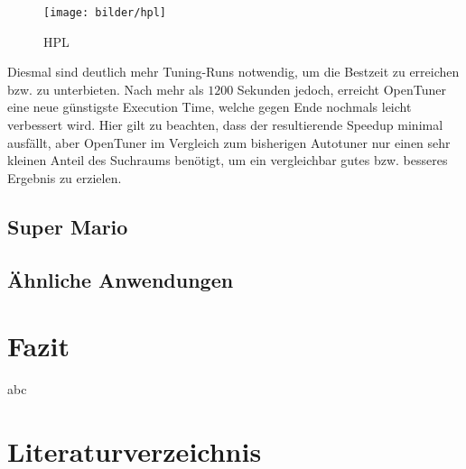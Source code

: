 \documentclass[a4paper,11pt]{scrartcl}
\newcommand{\bzw}{\mbox{bzw.}\xspace}
\begin{document}
\begin{figure}[h]
\begin{center}
\texttt{[image: bilder/hpl]}
\cite{OT-paper} \caption{HPL}
\end{center}
\end{figure}
Diesmal sind deutlich mehr Tuning-Runs notwendig, um die Bestzeit zu erreichen \bzw zu unterbieten.
Nach mehr als $1200$ Sekunden jedoch, erreicht OpenTuner eine neue günstigste Execution Time,
welche gegen Ende nochmals leicht verbessert wird. Hier gilt zu beachten, dass der resultierende
Speedup minimal ausfällt, aber OpenTuner im Vergleich zum bisherigen Autotuner nur einen 
sehr kleinen Anteil des Suchraums benötigt, um ein vergleichbar gutes \bzw besseres Ergebnis 
zu erzielen.


\subsection{Super Mario}

\subsection{Ähnliche Anwendungen}



\section{Fazit}
abc


\section{Literaturverzeichnis}
\end{document}
